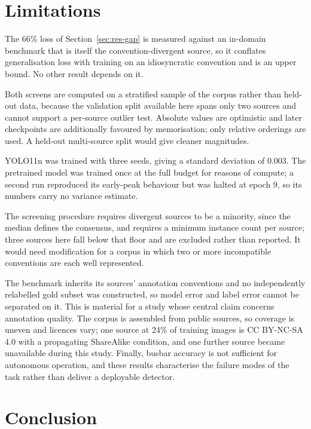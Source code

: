 \documentclass[conference]{IEEEtran}
\begin{document}
\section{Limitations}
\label{sec:limits}

The 66\% loss of Section~\ref{sec:res-gap} is measured against an in-domain benchmark
that is itself the convention-divergent source, so it conflates generalisation loss
with training on an idiosyncratic convention and is an upper bound. No other result
depends on it.

Both screens are computed on a stratified sample of the corpus rather than held-out
data, because the validation split available here spans only two sources and cannot
support a per-source outlier test. Absolute values are optimistic and later
checkpoints are additionally favoured by memorisation; only relative orderings are
used. A held-out multi-source split would give cleaner magnitudes.

YOLO11n was trained with three seeds, giving a standard deviation of 0.003. The
pretrained model was trained once at the full budget for reasons of compute; a second
run reproduced its early-peak behaviour but was halted at epoch 9, so its numbers
carry no variance estimate.

The screening procedure requires divergent sources to be a minority, since the median
defines the consensus, and requires a minimum instance count per source; three sources
here fall below that floor and are excluded rather than reported. It would need
modification for a corpus in which two or more incompatible conventions are each well
represented.

The benchmark inherits its sources' annotation conventions and no independently
relabelled gold subset was constructed, so model error and label error cannot be
separated on it. This is material for a study whose central claim concerns annotation
quality. The corpus is assembled from public sources, so coverage is uneven and
licences vary; one source at 24\% of training images is CC BY-NC-SA 4.0 with a
propagating ShareAlike condition, and one further source became unavailable during
this study. Finally, busbar accuracy is not sufficient for autonomous operation, and
these results characterise the failure modes of the task rather than deliver a
deployable detector.

\section{Conclusion}
\end{document}
